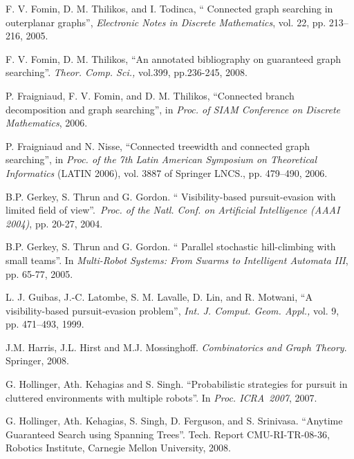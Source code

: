 \documentclass[11pt]{article}\usepackage{amsmath}
\begin{document}
\begin{thebibliography}{99}
F. V. Fomin, D. M. Thilikos, and I. Todinca, \textquotedblleft
Connected graph searching in outerplanar graphs\textquotedblright,
\emph{Electronic Notes in Discrete Mathematics}, vol. 22, pp. 213--216, 2005.

F. V. Fomin, D. M. Thilikos, \textquotedblleft An
annotated bibliography on guaranteed graph searching\textquotedblright.
\emph{Theor. Comp. Sci., }vol.399, pp.236-245, 2008.

P. Fraigniaud, F. V. Fomin, and D. M. Thilikos,
\textquotedblleft Connected branch decomposition and graph
searching\textquotedblright, in \emph{Proc. of SIAM Conference on Discrete
Mathematics}, 2006.

P. Fraigniaud and N. Nisse, \textquotedblleft Connected
treewidth and connected graph searching\textquotedblright, in \emph{Proc. of
the 7th Latin American Symposium on Theoretical Informatics} (LATIN 2006),
vol. 3887 of Springer LNCS., pp. 479--490, 2006.

B.P. Gerkey, S. Thrun and G. Gordon. \textquotedblleft
Visibility-based pursuit-evasion with limited field of view\textquotedblright .\ \emph{Proc. of the Natl. Conf. on Artificial Intelligence (AAAI 2004)}, pp.
20-27, 2004.

B.P. Gerkey, S. Thrun and G. Gordon. \textquotedblleft
Parallel stochastic hill-climbing with small teams\textquotedblright. In
\emph{Multi-Robot Systems: From Swarms to Intelligent Automata} \emph{III},
pp. 65-77, 2005.

L. J. Guibas, J.-C. Latombe, S. M. Lavalle, D. Lin, and R.
Motwani, \textquotedblleft A visibility-based pursuit-evasion
problem\textquotedblright, \emph{Int. J. Comput. Geom. Appl.,} vol. 9, pp.
471--493, 1999.

J.M. Harris, J.L. Hirst and M.J. Mossinghoff.
\emph{Combinatorics and Graph Theory}. Springer, 2008.

G. Hollinger, Ath. Kehagias and S. Singh.
\textquotedblleft Probabilistic strategies for pursuit in cluttered
environments with multiple robots\textquotedblright. In \emph{Proc.
ICRA\ 2007}, 2007.

G. Hollinger, Ath. Kehagias, S. Singh, D. Ferguson, and
S. Srinivasa. \textquotedblleft Anytime Guaranteed Search using Spanning
Trees\textquotedblright. Tech. Report CMU-RI-TR-08-36, Robotics Institute,
Carnegie Mellon University, 2008.


\end{thebibliography}
\end{document}

